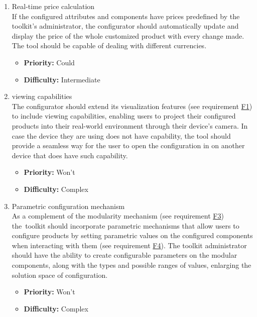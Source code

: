 \begin{enumerate}[label=\textbf{F\arabic*:}, leftmargin=30pt]
\item \label{itm:F18} Real-time price calculation
\vspace{2pt}
\\If the configured attributes and components have prices predefined by the toolkit's administrator, the configurator should automatically update and display the price of the whole customized product with every change made. The tool should be capable of dealing with different currencies.
\begin{itemize}[noitemsep, label=\trianglebullet]
    \item \textbf{Priority:} Could
    \item \textbf{Difficulty:} Intermediate
\end{itemize}
\vspace{4pt}

\item \label{itm:F19}  viewing capabilities
\vspace{2pt}
\\The configurator should extend its visualization features (see requirement \hyperref[itm:F1]{F1}) to include  viewing capabilities, enabling users to project their configured products into their real-world environment through their device's camera. In case the device they are using does not have  capability, the tool should provide a seamless way for the user to open \newpage the configuration in  on another device that does have such capability.
\begin{itemize}[noitemsep, label=\trianglebullet]
    \item \textbf{Priority:} Won't
    \item \textbf{Difficulty:} Complex
\end{itemize}
\vspace{4pt}

\item \label{itm:F20} Parametric configuration mechanism
\vspace{2pt}
\\As a complement of the modularity mechanism (see requirement \hyperref[itm:F3]{F3}) the~toolkit should incorporate parametric mechanisms that allow users to configure products by setting parametric values on the configured components when interacting with them (see requirement \hyperref[itm:F4]{F4}). The toolkit administrator should have the ability to create configurable parameters on the modular components, along with the types and possible ranges of values, enlarging the solution space of configuration.
\begin{itemize}[noitemsep, label=\trianglebullet]
    \item \textbf{Priority:} Won't
    \item \textbf{Difficulty:} Complex
\end{itemize}
\vspace{4pt}


\end{enumerate}
